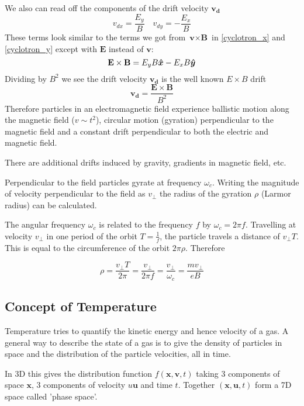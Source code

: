 We also can read off the components of the drift velocity $\bm{v_{d}}$
\begin{equation}
	v_{dx}=\frac{E_y}{B}\quad v_{dy}=-\frac{E_x}{B}
\end{equation}
These terms look similar to the terms we got from $\textbf{v}\times\textbf{B}$ in \eqref{cyclotron_x} and \eqref{cyclotron_y} except with $\textbf{E}$ instead of $\textbf{v}$:
\begin{equation}
	\textbf{E}\times\textbf{B}=E_yB\bm{\hat{x}}-E_xB\bm{\hat{y}}
\end{equation}
Dividing by $B^2$ we see the drift velocity $\bm{v_d}$ is the well known $E \times B$ drift
\begin{equation}
	\bm{v_d}=\frac{\bm{E} \times \bm{B}}{B^2}
\end{equation}
Therefore particles in an electromagnetic field experience ballistic motion along the magnetic field ($v \sim t^2$), circular motion (gyration) perpendicular to the magnetic field and a constant drift perpendicular to both the electric and magnetic field.

There are additional drifts induced by gravity, gradients in magnetic field, etc.

Perpendicular to the field particles gyrate at frequency $\omega_c$. Writing the magnitude of velocity perpendicular to the field as $v_{\perp}$ the radius of the gyration $\rho$ (Larmor radius) can be calculated.

The angular frequency $\omega_c$ is related to the frequency $f$ by $\omega_c=2\pi f$. Travelling at velocity $v_{\perp}$ in one period of the orbit $T = \frac{1}{f}$, the particle travels a distance of $v_{\perp}T$. This is equal to the circumference of the orbit $2\pi\rho$. Therefore

\begin{equation}
	\rho = \frac{v_{\perp}T}{2\pi} = \frac{v_{\perp}}{2\pi f} = \frac{v_\perp}{\omega_c}= \frac{mv_{\perp}}{eB}
\end{equation}

\subsection{Concept of Temperature}
Temperature tries to quantify the kinetic energy and hence velocity of a gas. A general way to describe the state of a gas is to give the density of particles in space and the distribution of the particle velocities, all in time.

In 3D this gives the distribution function $f(\textbf{x}, \textbf{v}, t)$ taking 3 components of space $\textbf{x}$, 3 components of velocity $u\textbf{u}$ and time $t$. Together $\left(\textbf{x}, \textbf{u}, t\right)$ form a 7D space called 'phase space'.

